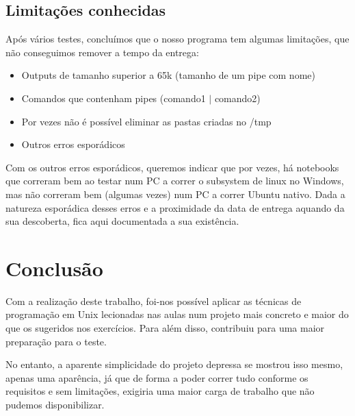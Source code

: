 \documentclass[a4paper]{article}
\begin{document}
	\subsection{Limitações conhecidas}
		\tab Após vários testes, concluímos que o nosso programa tem algumas limitações,
		que não conseguimos remover a tempo da entrega:
			\begin{itemize}
				\item Outputs de tamanho superior a 65k (tamanho de um pipe com nome)
				\item Comandos que contenham pipes (comando1 $|$ comando2)
				\item Por vezes não é possível eliminar as pastas criadas no /tmp
				\item Outros erros esporádicos
			\end{itemize}
		\par Com os outros erros esporádicos, queremos indicar que por vezes, há notebooks
		que correram bem ao testar num PC a correr o subsystem de linux no Windows, mas
		não correram bem (algumas vezes) num PC a correr Ubuntu nativo. Dada a natureza
		esporádica desses erros e a proximidade da data de entrega aquando da sua descoberta,
		fica aqui documentada a sua existência.

	\section{Conclusão}
	\tab Com a realização deste trabalho, foi-nos possível aplicar as técnicas
	de programação em Unix lecionadas nas aulas num projeto mais concreto e maior
	do que os sugeridos nos exercícios. Para além disso, contribuiu para uma maior
	preparação para o teste.
	\par No entanto, a aparente simplicidade do projeto depressa se mostrou isso mesmo,
	apenas uma aparência, já que de forma a poder correr tudo conforme os requisitos
	e sem limitações, exigiria uma maior carga de trabalho que não pudemos disponibilizar.
\end{document}
